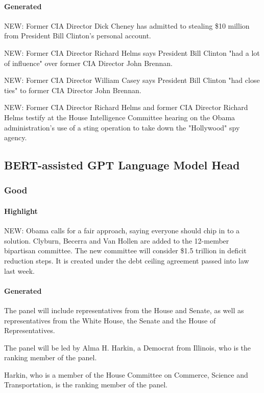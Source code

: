 \documentclass{article}
\begin{document}
\paragraph{Generated} 
NEW: Former CIA Director Dick Cheney has admitted to stealing \$10 million from President Bill Clinton's personal account.

NEW: Former CIA Director Richard Helms says President Bill Clinton "had a lot of influence" over former CIA Director John Brennan.

NEW: Former CIA Director William Casey says President Bill Clinton "had close ties" to former CIA Director John Brennan.

NEW: Former CIA Director Richard Helms and former CIA Director Richard Helms testify at the House Intelligence Committee hearing on the Obama administration's use of a sting operation to take down the "Hollywood" spy agency.


\subsection{BERT-assisted GPT Language Model Head}
\label{lm-w}

\subsubsection{Good}

\paragraph{Highlight} 
NEW: Obama calls for a fair approach, saying everyone should chip in to a solution. Clyburn, Becerra and Van Hollen are added to the 12-member bipartisan committee. The new committee will consider \$1.5 trillion in deficit reduction steps. It is created under the debt ceiling agreement passed into law last week.

\paragraph{Generated} 

The panel will include representatives from the House and Senate, as well as representatives from the White House, the Senate and the House of Representatives.

The panel will be led by Alma H. Harkin, a Democrat from Illinois, who is the ranking member of the panel.

Harkin, who is a member of the House Committee on Commerce, Science and Transportation, is the ranking member of the panel.
\end{document}

